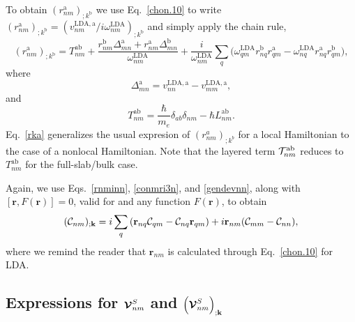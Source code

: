 \documentclass[floatfix,prb,aps,superscriptaddress,showpacs,11pt,preprint,letterpaper]{revtex4}
\begin{document}
To obtain $(r^{\mathrm{a}}_{nm})_{;k^{\mathrm{b}}}$ we use Eq.~\eqref{chon.10} to
write
$(r^{\mathrm{a}}_{nm})_{;k^{\mathrm{b}}}
=(v^{\mathrm{LDA},\mathrm{a}}_{nm}/i\omega^\mathrm{LDA}_{nm})_{;k^{\mathrm{b}}}
$ and simply apply the chain rule,
\begin{equation}
(r^{\mathrm{a}}_{nm})_{;k^{\mathrm{b}}}
=
T^{\mathrm{a}\mathrm{b}}_{nm}
+
\frac{ 
r^{\mathrm{b}}_{nm}
\Delta^{\mathrm{a}}_{mn}
+r^{\mathrm{a}}_{nm}
\Delta^{\mathrm{b}}_{mn}
}
{\omega^\mathrm{LDA}_{nm}}
+
\frac{i}{\omega^\mathrm{LDA}_{nm}}
\sum_{q}
\bigg(
\omega^\mathrm{LDA}_{q m} 
r^{\mathrm{b}}_{nq} 
r^{\mathrm{a}}_{q m}
-
\omega^\mathrm{LDA}_{nq} 
r^{\mathrm{a}}_{nq} 
r^{\mathrm{b}}_{q m}
\bigg)
,
\label{rka}
\end{equation} 
where 
\begin{equation*}
\Delta^{\mathrm{a}}_{mn}
=
v^{\mathrm{LDA},\mathrm{a}}_{nn}  
-
v^{\mathrm{LDA},\mathrm{a}}_{mm}  
,
\end{equation*}
and
\begin{equation}
T_{nm}^{\mathrm{a}\mathrm{b}}
=\frac{\hbar}{m_e}\delta_{ab}\delta_{nm} 
-\hbar L^{\mathrm{a}\mathrm{b}}_{nm} 
.
\label{tau.1n} 
\end{equation}
Eq.~\eqref{rka} generalizes the usual expresion of
$(r^a_{nm})_{;k^b}$ for a local 
Hamiltonian
\cite{aversaPRB95,nastosPRB05,cabellosPRB09,rashkeevPRB98}
to
the case of a
nonlocal Hamiltonian.
Note that the layered term
${\cal T}^{\mathrm{a}\mathrm{b}}_{nm}$ reduces to $T^{\mathrm{a}\mathrm{b}}_{nm}$
for the full-slab/bulk case.

Again, we use Eqs.~\eqref{rnminn}, \eqref{conmri3n}, and \eqref{gendevnn},
along with $[\mathbf{r},F(\mathbf{r})]=0$, valid for 
and any function $F(\mathbf{r})$, 
to obtain 
\begin{equation*} 
({\mathbf{\cal C}}_{nm})_{;\mathbf{k}}
=
i 
\sum_{q} 
 \left(\mathbf{r}_{nq}
{\mathbf{\cal C}}_{qm}
-
{\mathbf{\cal C}}_{nq}
\mathbf{r}_{qm}
\right) 
+i\mathbf{r}_{nm}({\mathbf{\cal C}}_{mm}-{\mathbf{\cal C}}_{nn}) 
,
\end{equation*} 
where we remind the reader that $\mathbf{r}_{nm}$ 
is calculated through 
Eq.~\eqref{chon.10} for LDA. 

\subsection{Expressions for  \texorpdfstring{$\boldsymbol{\mathcal{\cal V}}^{S}_{nm}$}{Vnm}
and
\texorpdfstring{$\Big({\boldsymbol{\mathcal{\cal V}}}^{S}_{nm}\Big)_{;\mathbf{k}}$}{(Vnm);kb}
}\label{calvs} 
\end{document}
